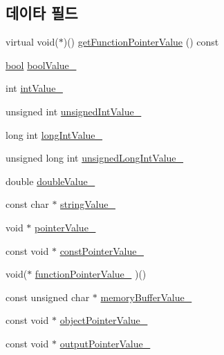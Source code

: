 \subsection*{데이타 필드}
\begin{DoxyCompactItemize}
\item 
virtual void($\ast$)() \hyperlink{class_mock_named_value_abd0a9fd7e8b1d7880c4f8b01ded85657}{get\+Function\+Pointer\+Value} () const
\item 
\hyperlink{avb__gptp_8h_af6a258d8f3ee5206d682d799316314b1}{bool} \hyperlink{class_mock_named_value_a09abee451cc622d483014dedcec24e58}{bool\+Value\+\_\+}
\item 
int \hyperlink{class_mock_named_value_a1da7506365ae1c2052808377b4a26791}{int\+Value\+\_\+}
\item 
unsigned int \hyperlink{class_mock_named_value_ac7bbeb1249238a3f9c83854c5794a19b}{unsigned\+Int\+Value\+\_\+}
\item 
long int \hyperlink{class_mock_named_value_afce071bcbe8335723084f41802df821b}{long\+Int\+Value\+\_\+}
\item 
unsigned long int \hyperlink{class_mock_named_value_ab8e3b434b1b928416e2b0ff65f054869}{unsigned\+Long\+Int\+Value\+\_\+}
\item 
double \hyperlink{class_mock_named_value_ae4bad993fe1e1b4c4b3225670868efa5}{double\+Value\+\_\+}
\item 
const char $\ast$ \hyperlink{class_mock_named_value_a5bc77c3f80ddeee4a5745eb1daec72dc}{string\+Value\+\_\+}
\item 
void $\ast$ \hyperlink{class_mock_named_value_a6832f12cf49d97bb10da35211fa5039a}{pointer\+Value\+\_\+}
\item 
const void $\ast$ \hyperlink{class_mock_named_value_a38076acabeb10cc2757cabdb9365b46e}{const\+Pointer\+Value\+\_\+}
\item 
void($\ast$ \hyperlink{class_mock_named_value_aef42fb6617558520f912651fbfe07c53}{function\+Pointer\+Value\+\_\+} )()
\item 
const unsigned char $\ast$ \hyperlink{class_mock_named_value_acfb46de823cfde8810c5bae34dd454b2}{memory\+Buffer\+Value\+\_\+}
\item 
const void $\ast$ \hyperlink{class_mock_named_value_a436d0ca15a91547fb0b3a39249a42843}{object\+Pointer\+Value\+\_\+}
\item 
const void $\ast$ \hyperlink{class_mock_named_value_aaac935d697b2f0e695e32d2293595450}{output\+Pointer\+Value\+\_\+}
\end{DoxyCompactItemize}
